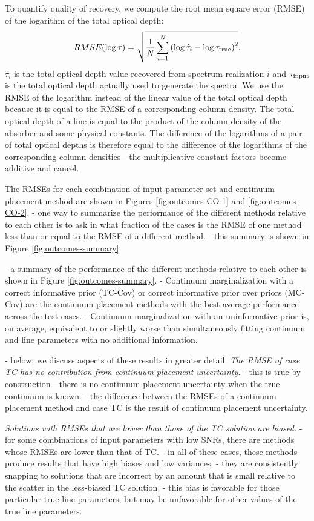 \documentclass[trackchanges]{aastex62}
\begin{document}
{To quantify quality of recovery, we compute the root mean square error (RMSE) of the logarithm of the total optical depth:
\begin{equation}
  \label{eqn:RMSE-def}
  RMSE(\log\tau) = \sqrt{
    \frac{1}{N} \sum_{i=1}^{N} \left( \log\hat{\tau}_i - \log\tau_{\rm true} \right)^2
  }.
\end{equation}
$\hat{\tau}_i$ is the total optical depth value recovered from spectrum realization $i$ and $\tau_{\rm input}$ is the total optical depth actually used to generate the spectra.
We use the RMSE of the logarithm instead of the linear value of the total optical depth because it is equal to the RMSE of a corresponding column density.
The total optical depth of a line is equal to the product of the column density of the absorber and some physical constants.
The difference of the logarithms of a pair of total optical depths is therefore equal to the difference of the logarithms of the corresponding column densities---the multiplicative constant factors become additive and cancel.

The RMSEs for each combination of input parameter set and continuum placement method are shown in Figures \ref{fig:outcomes-CO-1} and \ref{fig:outcomes-CO-2}.
- one way to summarize the performance of the different methods relative to each other is to ask in what fraction of the cases is the RMSE of one method less than or equal to the RMSE of a different method.
- this summary is shown in Figure \ref{fig:outcomes-summary}.

- a summary of the performance of the different methods relative to each other is shown in Figure \ref{fig:outcomes-summary}.
- Continuum marginalization with a correct informative prior (TC-Cov) or correct informative prior over priors (MC-Cov) are the continuum placement methods with the best average performance across the test cases.
- Continuum marginalization with an uninformative prior is, on average, equivalent to or slightly worse than simultaneously fitting continuum and line parameters with no additional information.

- below, we discuss aspects of these results in greater detail.
\emph{The RMSE of case TC has no contribution from continuum placement uncertainty.}
- this is true by construction---there is no continuum placement uncertainty when the true continuum is known.
- the difference between the RMSEs of a continuum placement method and case TC is the result of continuum placement uncertainty.

\emph{Solutions with RMSEs that are lower than those of the TC solution are biased.}
- for some combinations of input parameters with low SNRs, there are methods whose RMSEs are lower than that of TC.
- in all of these cases, these methods produce results that have high biases and low variances.
- they are consistently snapping to solutions that are incorrect by an amount that is small relative to the scatter in the less-biased TC solution.
- this bias is favorable for those particular true line parameters, but may be unfavorable for other values of the true line parameters.

}
\end{document}
